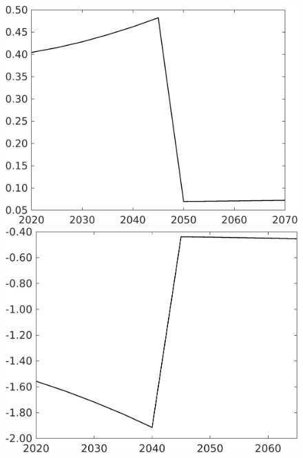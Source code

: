 \begin{figure}[h!!!]
\begin{minipage}[]{0.32\textwidth}
		\includegraphics[width=1\textwidth]{../../codding_model/own_basedOnFried/optimalPol_010922_revision/figures/all_13Sept22_Tplus30/tauf_OPT_COMPtaulPer_regime4_spillover0_knspil1_noskill1_sep0_xgrowth0_PV1_etaa0.79.png}
	\end{minipage}
	\begin{minipage}[]{0.32\textwidth}
		\includegraphics[width=1\textwidth]{../../codding_model/own_basedOnFried/optimalPol_010922_revision/figures/all_13Sept22_Tplus30/gAf_OPT_COMPtaulPer_regime4_spillover0_knspil1_noskill1_sep0_xgrowth0_PV1_etaa0.79.png}
	\end{minipage}
	\begin{minipage}[]{0.32\textwidth}

\end{minipage}
\end{figure}
